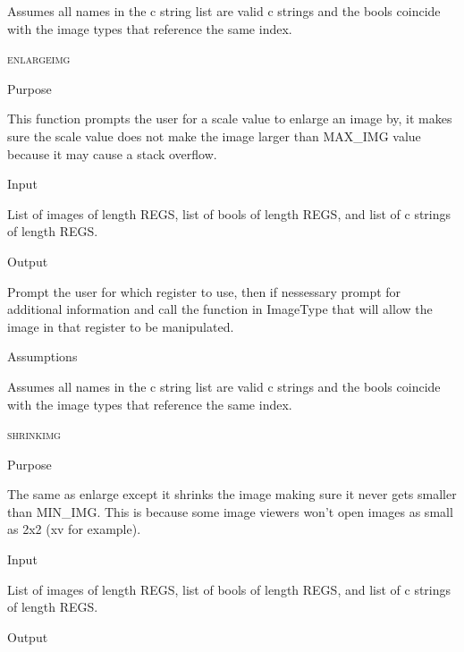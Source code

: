 \documentclass[pdftex, 11pt]{article}
\begin{document}
\begin{description}
\begin{description}
				Assumes all names in the c string list are valid c
				strings and the bools coincide with the image types that
				reference the same index.

		\end{description}



	\item{\textsc{enlargeimg}}
		\begin{description}
			\item{Purpose}

				This function prompts the user for a scale value to enlarge an image by, it
				makes sure the scale value does not make the image larger than MAX\_IMG value
				because it may cause a stack overflow.

			\item{Input}

				List of images of length REGS, list of bools of length
				REGS, and list of c strings of length REGS.

			\item{Output}

				Prompt the user for which register to use, then if nessessary
				prompt for additional information and call the function
				in ImageType that will allow the image in that register to
				be manipulated.

			\item{Assumptions}

				Assumes all names in the c string list are valid c
				strings and the bools coincide with the image types that
				reference the same index.

		\end{description}



	\item{\textsc{shrinkimg}}
		\begin{description}
			\item{Purpose}

				The same as enlarge except it shrinks the image making sure it never gets
				smaller than MIN\_IMG.  This is because some image viewers won't open images
				as small as 2x2 (xv for example).

			\item{Input}

				List of images of length REGS, list of bools of length
				REGS, and list of c strings of length REGS.

			\item{Output}


\end{description}
\end{description}
\end{document}
